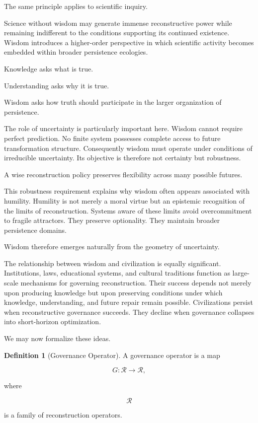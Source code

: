 \documentclass[12pt,oneside]{article}
\theoremstyle{definition}
\newtheorem{definition}[theorem]{Definition} \newtheorem{axiom}[theorem]{Axiom} \newtheorem{remark}[theorem]{Remark} \newtheorem{example}[theorem]{Example}
\begin{document}
The same principle applies to scientific inquiry.

Science without wisdom may generate immense reconstructive power while remaining indifferent to the conditions supporting its continued existence. Wisdom introduces a higher-order perspective in which scientific activity becomes embedded within broader persistence ecologies.

Knowledge asks what is true.

Understanding asks why it is true.

Wisdom asks how truth should participate in the larger organization of persistence.

The role of uncertainty is particularly important here. Wisdom cannot require perfect prediction. No finite system possesses complete access to future transformation structure. Consequently wisdom must operate under conditions of irreducible uncertainty. Its objective is therefore not certainty but robustness.

A wise reconstruction policy preserves flexibility across many possible futures.

This robustness requirement explains why wisdom often appears associated with humility. Humility is not merely a moral virtue but an epistemic recognition of the limits of reconstruction. Systems aware of these limits avoid overcommitment to fragile attractors. They preserve optionality. They maintain broader persistence domains.

Wisdom therefore emerges naturally from the geometry of uncertainty.

The relationship between wisdom and civilization is equally significant. Institutions, laws, educational systems, and cultural traditions function as large-scale mechanisms for governing reconstruction. Their success depends not merely upon producing knowledge but upon preserving conditions under which knowledge, understanding, and future repair remain possible. Civilizations persist when reconstructive governance succeeds. They decline when governance collapses into short-horizon optimization.

We may now formalize these ideas.

\begin{definition}[Governance Operator]

A governance operator is a map

\[
G :
\mathcal R
\rightarrow
\mathcal R,
\]

where

\[
\mathcal R
\]

is a family of reconstruction operators.

\end{definition}
\end{document}
